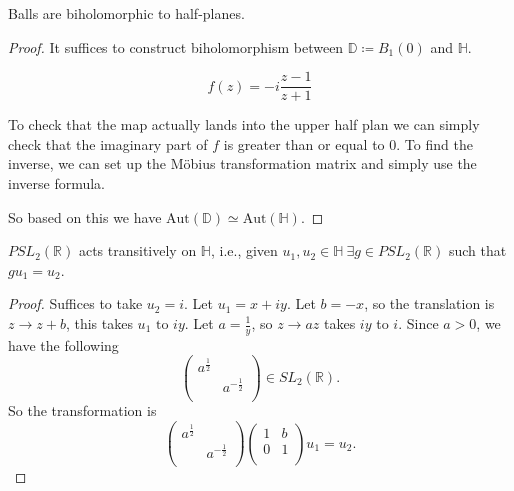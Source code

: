 \documentclass{article}
\begin{document}
\begin{lem}{}{}
Balls are biholomorphic to half-planes. 
\tcbline
\begin{proof}

It suffices to construct biholomorphism between \( \mathbb{D} \coloneqq B_1(0) \) and \( \mathbb{H}  \). 

\[f(z) = - i\frac{z - 1}{z + 1}  \]

To check that the map actually lands into the upper half plan we can simply check that the imaginary part of \( f \) is greater than or equal to \( 0 \). To find the inverse, we can set up the Möbius transformation matrix and simply use the inverse formula. 

So based on this we have \( \mathrm{Aut}(\mathbb{D} ) \simeq \mathrm{Aut} (\mathbb{H} )   \). 
\end{proof}
    
\end{lem}

\begin{lem}{}{}
\( PSL_2(\mathbb{R} )  \) acts transitively on \( \mathbb{H}  \), i.e., given \( u_1, u_2 \in \mathbb{H} \ \exists g\in PSL_2(\mathbb{R} )  \) such that \( gu_1 = u_2 \). 

\tcbline
\begin{proof}
Suffices to take \( u_2 = i\). Let \( u_1 = x + iy \). Let \( b =- x \), so the translation is \( z \to  z + b \), this takes \( u_1 \text{ to } iy \). Let \( a = \frac{1}{y} \), so \( z \to az \) takes \( iy\)  to \( i \). Since \( a > 0 \), we have the following 
\[
    \begin{pmatrix}
        a^{\frac{1}{2}} &   \\
         &   a^{-\frac{1}{2}}\\
    \end{pmatrix} \in SL_2(\mathbb{R} ). 
\]
So the transformation is
\[
    \begin{pmatrix}
        a^{\frac{1}{2}} &   \\
         &   a^{-\frac{1}{2}}\\
    \end{pmatrix} \begin{pmatrix}
        1 & b  \\
        0 &  1 \\
    \end{pmatrix}u_1 = u_2.
\]
\end{proof}

\end{lem}
\end{document}
